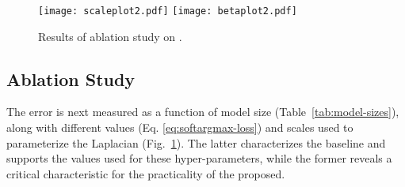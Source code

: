 \documentclass[10pt,twocolumn,letterpaper]{article}
\begin{document}
\begin{table}[t!]
\centering
\caption{\gls{nmse} on 300W (full set) for networks trained with fewer channels in each convolutional layer by , , , , and unmodified in size (\ie the original) listed from left-to-right. We measured performance with a 2.8GHz Intel Core i7 CPU.}
\label{tab:model-sizes}
\centering
{}
    \vspace{-3mm}
\end{table}


\begin{figure}[t!]
    \centering
    \texttt{[image: scaleplot2.pdf]}
    \texttt{[image: betaplot2.pdf]}

    \caption{Results of ablation study on .}
    \label{fig:ablation}
\end{figure}



\subsection{Ablation Study}
The error is next measured as a function of model size (Table~\ref{tab:model-sizes}), along with different values (Eq. \ref{eq:softargmax-loss}) and scales  used to parameterize the Laplacian (Fig.~\ref{fig:ablation}). The latter characterizes the baseline and supports the values used for these hyper-parameters, while the former reveals a critical characteristic for the practicality of the proposed. 
\end{document}
